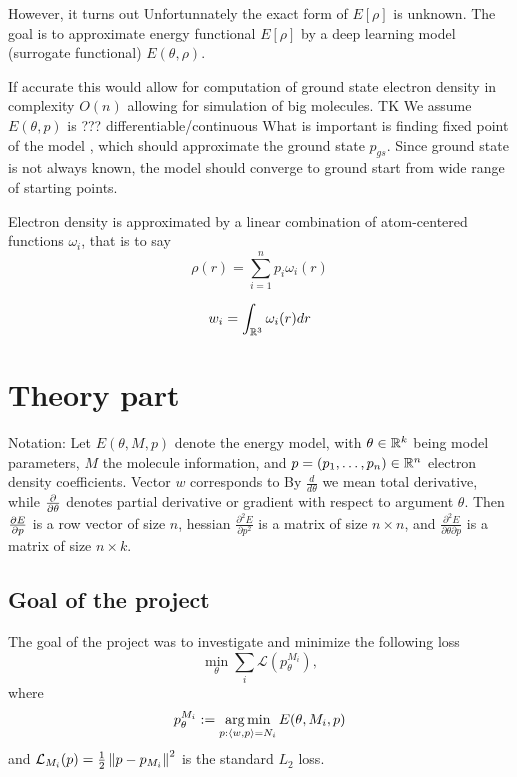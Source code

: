 \documentclass[a4paper,10pt]{report}
\begin{document}
However, it turns out
Unfortunnately the exact form of $E[\rho]$ is unknown.
The goal is to approximate energy functional $E[\rho]$ by a deep learning model (surrogate functional) $E(\theta, \rho)$.


If accurate this would allow for computation of ground state electron density in complexity $O(n)$ allowing for simulation  of big molecules.
TK
We assume $E(\theta, p)$ is ??? differentiable/continuous
What is important is finding fixed point of the model , which should approximate the ground state $p_{gs}$.
Since ground state is not always known, the model should converge to ground start from wide range of starting points.


Electron density is approximated by a linear combination of atom-centered functions $\omega_i$, that is to say
\begin{equation}
 \rho(r) = \sum_{i=1}^n p_i \omega_i(r)
\end{equation}

\begin{equation}
 w_i = \int_{\mathbb{R}^3} \omega_i(r)dr
\end{equation}


\newpage

\section{Theory part}
Notation: Let $E(\theta, M ,p)$ denote the energy model, with $\theta \in \mathbb{R}^k$ being model parameters, $M$ the molecule information, and $p=(p_1, \ldots ,p_n )\in \mathbb{R}^n$ electron density coefficients. Vector $w$ corresponds to
By $\frac{d}{d\theta}$ we mean total derivative, while $\frac{\partial }{\partial \theta}$ denotes partial derivative or gradient with respect to argument $\theta$. Then $\frac{\partial E}{\partial p}$ is a row vector of size $n$, hessian $\frac{\partial^2 E}{ \partial p^2 }$ is a matrix of size $n \times n$, and $\frac{\partial^2 E}{\partial \theta \partial p}$ is a matrix of size $n \times k $.


\subsection{Goal of the project}
The goal of the project was to investigate and minimize the following loss
\begin{equation}\label{bilevel}
 \min_\theta \sum_i \mathcal{L}(p_{\theta}^{M_i}),
\end{equation}
where
\begin{equation}
  p_\theta^{M_i}:=\operatorname*{arg\,min}_{p : \langle w, p \rangle=N_i} E(\theta,M_i,p)
\end{equation}
and $\mathcal{L}_{M_i}(p) = \frac{1}{2}\left\|p-p_{M_i}\right\|^2$ is the standard $L_2$ loss.
\end{document}
